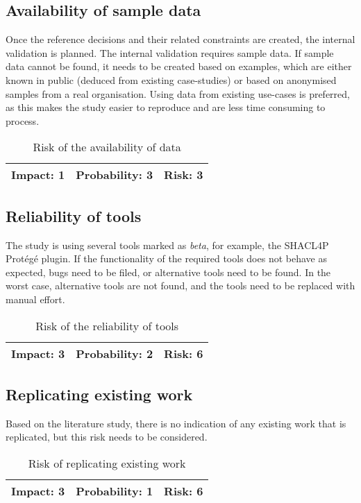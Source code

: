 \subsection{Availability of sample data} \label{aod}
Once the reference decisions and their related constraints are created, the internal validation is planned. The internal validation requires sample data. If sample data cannot be found, it needs to be created based on examples, which are either known in public (deduced from existing case-studies) or based on anonymised samples from a real organisation. Using data from existing use-cases is preferred, as this makes the study easier to reproduce and are less time consuming to process. 

\begin{table}[!htbp]
\centering
\begin{tabular}{| p{3cm} | p{3cm} | p{3cm} |}
\hline
Impact: 1 & Probability: 3 & Risk: 3 \\
\hline
\end{tabular}
\caption{Risk of the availability of data}
\label{table:aod}
\end{table}

\subsection{Reliability of tools} \label{rot}
The study is using several tools marked as \emph{beta}, for example, the SHACL4P Prot\'eg\'e plugin. If the functionality of the required tools does not behave as expected, bugs need to be filed, or alternative tools need to be found. In the worst case, alternative tools are not found, and the tools need to be replaced with manual effort.

\begin{table}[!htbp]
\centering
\begin{tabular}{| p{3cm} | p{3cm} | p{3cm} |}
\hline
Impact: 3 & Probability: 2 & Risk: 6 \\
\hline
\end{tabular}
\caption{Risk of the reliability of tools}
\label{table:rot}
\end{table}

\subsection{Replicating existing work} \label{rew}
Based on the literature study, there is no indication of any existing work that is replicated, but this risk needs to be considered.

\begin{table}[!htbp]
\centering
\begin{tabular}{| p{3cm} | p{3cm} | p{3cm} |}
\hline
Impact: 3 & Probability: 1 & Risk: 6 \\
\hline
\end{tabular}
\caption{Risk of replicating existing work}
\label{table:rew}
\end{table}